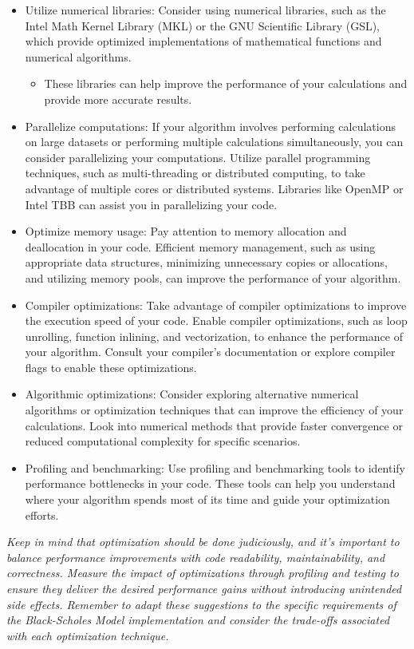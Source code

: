 \documentclass{assignment}
\begin{document}
\begin{problem}
\begin{itemize}
    \item Utilize numerical libraries: Consider using numerical libraries, such as the Intel Math Kernel Library (MKL) or the GNU Scientific Library (GSL), which provide optimized implementations of mathematical functions and numerical algorithms. 
    \begin{itemize}
        \item These libraries can help improve the performance of your calculations and provide more accurate results.
    \end{itemize}
    \item Parallelize computations: If your algorithm involves performing calculations on large datasets or performing multiple calculations simultaneously, you can consider parallelizing your computations.
    Utilize parallel programming techniques, such as multi-threading or distributed computing, to take advantage of multiple cores or distributed systems. 
    Libraries like OpenMP or Intel TBB can assist you in parallelizing your code. 
    \item Optimize memory usage: Pay attention to memory allocation and deallocation in your code. 
    Efficient memory management, such as using appropriate data structures, minimizing unnecessary copies or allocations, and utilizing memory pools, can improve the performance of your algorithm.
    \item Compiler optimizations: Take advantage of compiler optimizations to improve the execution speed of your code. 
    Enable compiler optimizations, such as loop unrolling, function inlining, and vectorization, to enhance the performance of your algorithm. 
    Consult your compiler's documentation or explore compiler flags to enable these optimizations.
    \item Algorithmic optimizations: Consider exploring alternative numerical algorithms or optimization techniques that can improve the efficiency of your calculations. 
    Look into numerical methods that provide faster convergence or reduced computational complexity for specific scenarios.
    \item Profiling and benchmarking: Use profiling and benchmarking tools to identify performance bottlenecks in your code. 
    These tools can help you understand where your algorithm spends most of its time and guide your optimization efforts.
\end{itemize}

\noindent \textit{Keep in mind that optimization should be done judiciously, and it's important to balance performance improvements with code readability, maintainability, and correctness. Measure the impact of optimizations through profiling and testing to ensure they deliver the desired performance gains without introducing unintended side effects.
Remember to adapt these suggestions to the specific requirements of the Black-Scholes Model implementation and consider the trade-offs associated with each optimization technique.
} \\\\




\end{problem}
\end{document}
